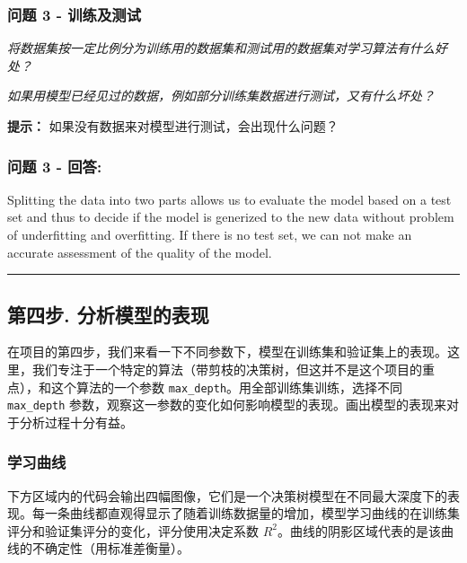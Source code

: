 \documentclass[11pt]{article}
\begin{document}
    \subsubsection{问题 3 -
训练及测试}\label{ux95eeux9898-3---ux8badux7ec3ux53caux6d4bux8bd5}

\emph{将数据集按一定比例分为训练用的数据集和测试用的数据集对学习算法有什么好处？}

\emph{如果用模型已经见过的数据，例如部分训练集数据进行测试，又有什么坏处？}

\textbf{提示：} 如果没有数据来对模型进行测试，会出现什么问题？

    \subsubsection{问题 3 - 回答:}\label{ux95eeux9898-3---ux56deux7b54}

Splitting the data into two parts allows us to evaluate the model based
on a test set and thus to decide if the model is generized to the new
data without problem of underfitting and overfitting. If there is no
test set, we can not make an accurate assessment of the quality of the
model.

    \begin{center}\rule{0.5\linewidth}{\linethickness}\end{center}

\subsection{第四步.
分析模型的表现}\label{ux7b2cux56dbux6b65.-ux5206ux6790ux6a21ux578bux7684ux8868ux73b0}

在项目的第四步，我们来看一下不同参数下，模型在训练集和验证集上的表现。这里，我们专注于一个特定的算法（带剪枝的决策树，但这并不是这个项目的重点），和这个算法的一个参数
\texttt{\textquotesingle{}max\_depth\textquotesingle{}}。用全部训练集训练，选择不同\texttt{\textquotesingle{}max\_depth\textquotesingle{}}
参数，观察这一参数的变化如何影响模型的表现。画出模型的表现来对于分析过程十分有益。

    \subsubsection{学习曲线}\label{ux5b66ux4e60ux66f2ux7ebf}

下方区域内的代码会输出四幅图像，它们是一个决策树模型在不同最大深度下的表现。每一条曲线都直观得显示了随着训练数据量的增加，模型学习曲线的在训练集评分和验证集评分的变化，评分使用决定系数
\(R^2\)。曲线的阴影区域代表的是该曲线的不确定性（用标准差衡量）。
\end{document}
